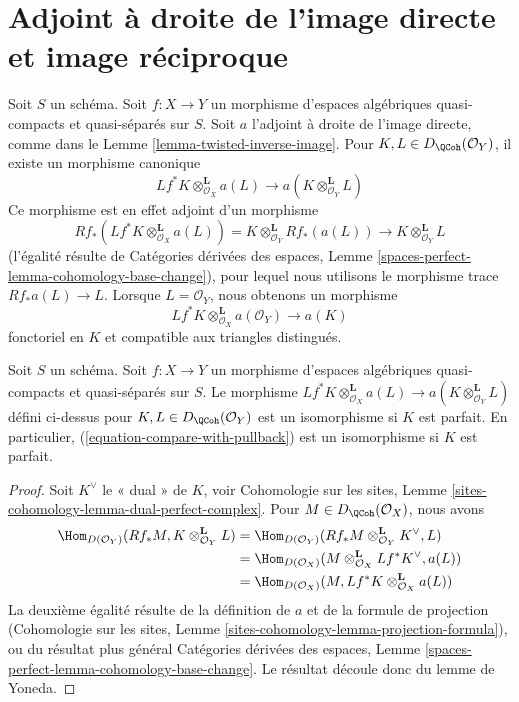  
\section{Adjoint à droite de l'image directe et image réciproque}
\label{section-compare-with-pullback}

\noindent
Soit $S$ un schéma.
Soit $f : X \to Y$ un morphisme d'espaces algébriques quasi-compacts et quasi-séparés
sur $S$.
Soit $a$ l'adjoint à droite de l'image directe, comme dans le
Lemme \ref{lemma-twisted-inverse-image}. Pour $K, L \in D_\QCoh(\mathcal{O}_Y)$,
il existe un morphisme canonique
$$
Lf^*K \otimes^\mathbf{L}_{\mathcal{O}_X} a(L)
\longrightarrow
a(K \otimes_{\mathcal{O}_Y}^\mathbf{L} L)
$$
Ce morphisme est en effet adjoint d'un morphisme
$$
Rf_*(Lf^*K \otimes^\mathbf{L}_{\mathcal{O}_X} a(L)) =
K \otimes^\mathbf{L}_{\mathcal{O}_Y} Rf_*(a(L))
\longrightarrow
K \otimes^\mathbf{L}_{\mathcal{O}_Y} L
$$
(l'égalité résulte de Catégories dérivées des espaces, Lemme
\ref{spaces-perfect-lemma-cohomology-base-change}),
pour lequel nous utilisons le morphisme trace $Rf_*a(L) \to L$.
Lorsque $L = \mathcal{O}_Y$, nous obtenons un morphisme
\begin{equation}
\label{equation-compare-with-pullback}
Lf^*K \otimes^\mathbf{L}_{\mathcal{O}_X} a(\mathcal{O}_Y) \longrightarrow a(K)
\end{equation}
fonctoriel en $K$ et compatible aux triangles distingués.

\begin{lemma}
\label{lemma-compare-with-pullback-perfect}
Soit $S$ un schéma.
Soit $f : X \to Y$ un morphisme d'espaces algébriques quasi-compacts et quasi-séparés
sur $S$. Le morphisme
$Lf^*K \otimes^\mathbf{L}_{\mathcal{O}_X} a(L) \to
a(K \otimes_{\mathcal{O}_Y}^\mathbf{L} L)$
défini ci-dessus pour $K, L \in D_\QCoh(\mathcal{O}_Y)$
est un isomorphisme si $K$ est parfait. En particulier,
(\ref{equation-compare-with-pullback}) est un isomorphisme si $K$ est parfait.
\end{lemma}

\begin{proof}
Soit $K^\vee$ le « dual » de $K$, voir
Cohomologie sur les sites, Lemme \ref{sites-cohomology-lemma-dual-perfect-complex}.
Pour $M \in D_\QCoh(\mathcal{O}_X)$, nous avons
\begin{align*}
\Hom_{D(\mathcal{O}_Y)}(Rf_*M, K \otimes^\mathbf{L}_{\mathcal{O}_Y} L)
& =
\Hom_{D(\mathcal{O}_Y)}(
Rf_*M \otimes^\mathbf{L}_{\mathcal{O}_Y} K^\vee, L) \\
& =
\Hom_{D(\mathcal{O}_X)}(
M \otimes^\mathbf{L}_{\mathcal{O}_X} Lf^*K^\vee, a(L)) \\
& =
\Hom_{D(\mathcal{O}_X)}(M,
Lf^*K \otimes^\mathbf{L}_{\mathcal{O}_X} a(L))
\end{align*}
La deuxième égalité résulte de la définition de $a$ et de la formule de projection
(Cohomologie sur les sites, Lemme
\ref{sites-cohomology-lemma-projection-formula}),
ou du résultat plus général Catégories dérivées des espaces, Lemme
\ref{spaces-perfect-lemma-cohomology-base-change}.
Le résultat découle donc du lemme de Yoneda.
\end{proof}

